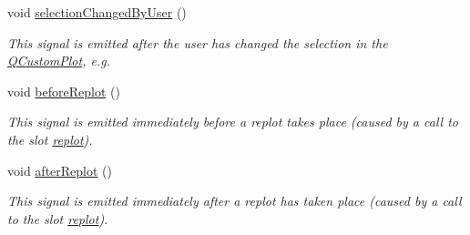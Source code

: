 \begin{DoxyCompactItemize}
void \hyperlink{classQCustomPlot_a500c64a109bc773c973ad274f2fa4190}{selection\+Changed\+By\+User} ()
\begin{DoxyCompactList}\small\item\em This signal is emitted after the user has changed the selection in the \hyperlink{classQCustomPlot}{Q\+Custom\+Plot}, e.\+g. \end{DoxyCompactList}\item 
void \hyperlink{classQCustomPlot_a0cd30e29b73efd6afe096e44bc5956f5}{before\+Replot} ()
\begin{DoxyCompactList}\small\item\em This signal is emitted immediately before a replot takes place (caused by a call to the slot \hyperlink{classQCustomPlot_a606fd384b2a637ce2c24899bcbde77d6}{replot}). \end{DoxyCompactList}\item 
void \hyperlink{classQCustomPlot_a6f4fa624af060bc5919c5f266cf426a0}{after\+Replot} ()
\begin{DoxyCompactList}\small\item\em This signal is emitted immediately after a replot has taken place (caused by a call to the slot \hyperlink{classQCustomPlot_a606fd384b2a637ce2c24899bcbde77d6}{replot}). \end{DoxyCompactList}\end{DoxyCompactItemize}
